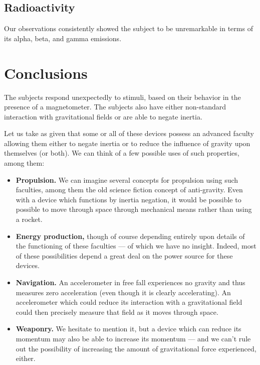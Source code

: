 \documentclass[10pt]{article}
\theoremstyle{definition}
\begin{document}
\subsection{Radioactivity}
Our observations consistently showed the subject to be unremarkable in terms of its alpha, beta, and gamma emissions.

\section{Conclusions}\label{conclusions}
The subjects respond unexpectedly to stimuli, based on their behavior in the presence of a magnetometer. The subjects also have either non-standard interaction with gravitational fields or are able to negate inertia.

Let us take as given that some or all of these devices possess an advanced faculty allowing them either to negate inertia or to reduce the influence of gravity upon themselves (or both).
We can think of a few possible uses of such properties, among them:
\begin{itemize}
\item \textbf{Propulsion.} We can imagine several concepts for propulsion using such faculties, among them the old science fiction concept of anti-gravity. Even with a device which functions by inertia negation, it would be possible to possible to move through space through mechanical means rather than using a rocket.
\item \textbf{Energy production,} though of course depending entirely upon details of the functioning of these faculties --- of which we have no insight. Indeed, most of these possibilities depend a great deal on the power source for these devices.
\item \textbf{Navigation.} An accelerometer in free fall experiences no gravity and thus measures zero acceleration (even though it is clearly accelerating). An accelerometer which could reduce its interaction with a gravitational field could then precisely measure that field as it moves through space.
\item \textbf{Weaponry.} We hesitate to mention it, but a device which can reduce its momentum may also be able to increase its momentum --- and we can't rule out the possibility of increasing the amount of gravitational force experienced, either.
\end{itemize}

 
\end{document}
